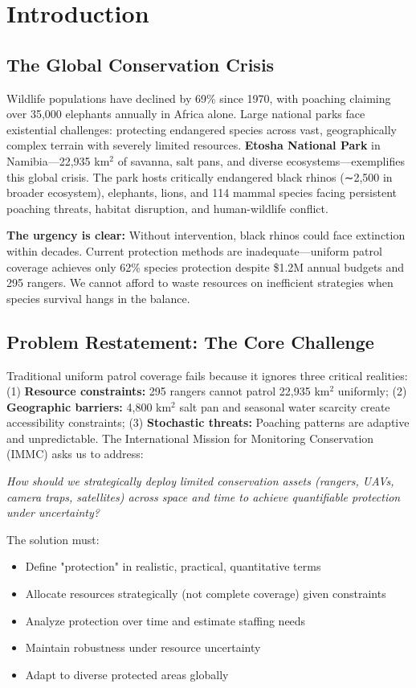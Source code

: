 \section{Introduction}

\subsection{The Global Conservation Crisis}

Wildlife populations have declined by 69\% since 1970, with poaching claiming over 35,000 elephants annually in Africa alone. Large national parks face existential challenges: protecting endangered species across vast, geographically complex terrain with severely limited resources. \textbf{Etosha National Park} in Namibia—22,935 km$^2$ of savanna, salt pans, and diverse ecosystems—exemplifies this global crisis. The park hosts critically endangered black rhinos (∼2,500 in broader ecosystem), elephants, lions, and 114 mammal species facing persistent poaching threats, habitat disruption, and human-wildlife conflict.

\noindent \textbf{The urgency is clear:} Without intervention, black rhinos could face extinction within decades. Current protection methods are inadequate—uniform patrol coverage achieves only 62\% species protection despite \$1.2M annual budgets and 295 rangers. We cannot afford to waste resources on inefficient strategies when species survival hangs in the balance.

\subsection{Problem Restatement: The Core Challenge}

Traditional uniform patrol coverage fails because it ignores three critical realities: (1) \textbf{Resource constraints:} 295 rangers cannot patrol 22,935 km$^2$ uniformly; (2) \textbf{Geographic barriers:} 4,800 km$^2$ salt pan and seasonal water scarcity create accessibility constraints; (3) \textbf{Stochastic threats:} Poaching patterns are adaptive and unpredictable. The International Mission for Monitoring Conservation (IMMC) asks us to address:

\textit{How should we strategically deploy limited conservation assets (rangers, UAVs, camera traps, satellites) across space and time to achieve quantifiable protection under uncertainty?}

The solution must:
\begin{itemize}
    \item Define "protection" in realistic, practical, quantitative terms
    \item Allocate resources strategically (not complete coverage) given constraints
    \item Analyze protection over time and estimate staffing needs
    \item Maintain robustness under resource uncertainty
    \item Adapt to diverse protected areas globally
\end{itemize}

